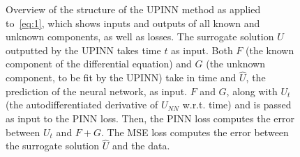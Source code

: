 \documentclass{article}
\begin{document}
\begin{figure}[h]
    \caption{Overview of the structure of the UPINN method as applied to~\eqref{eq:1}, which shows inputs and outputs of all known and unknown components, as well as losses. The surrogate solution $U$ outputted by the UPINN takes time $t$ as input. Both $F$ (the known component of the differential equation) and $G$ (the unknown component, to be fit by the UPINN) take in time and $\hat{U}$, the prediction of the neural network, as input. $F$ and $G$, along with $U_t$ (the autodifferentiated derivative of $U_{NN}$ w.r.t. time) and is passed as input to the PINN loss. Then, the PINN loss computes the error between $U_t$ and $F+G$. The MSE loss computes the error between the surrogate solution $\hat{U}$ and the data.}
    \label{fig:upinn_structure}
\end{figure}
\end{document}
